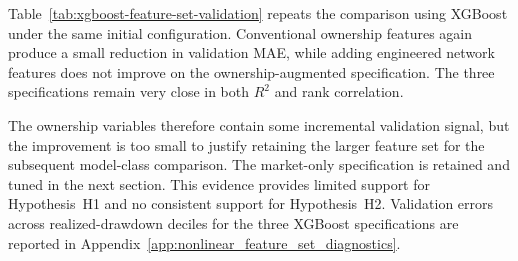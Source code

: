 Table~\ref{tab:xgboost-feature-set-validation} repeats the comparison using XGBoost under the same initial configuration. Conventional ownership features again produce a small reduction in validation MAE, while adding engineered network features does not improve on the ownership-augmented specification. The three specifications remain very close in both $R^2$ and rank correlation.



\noindent
The ownership variables therefore contain some incremental validation signal, but the improvement is too small to justify retaining the larger feature set for the subsequent model-class comparison. The market-only specification is retained and tuned in the next section. This evidence provides limited support for Hypothesis~H1 and no consistent support for Hypothesis~H2. Validation errors across realized-drawdown deciles for the three XGBoost specifications are reported in Appendix~\ref{app:nonlinear_feature_set_diagnostics}.
